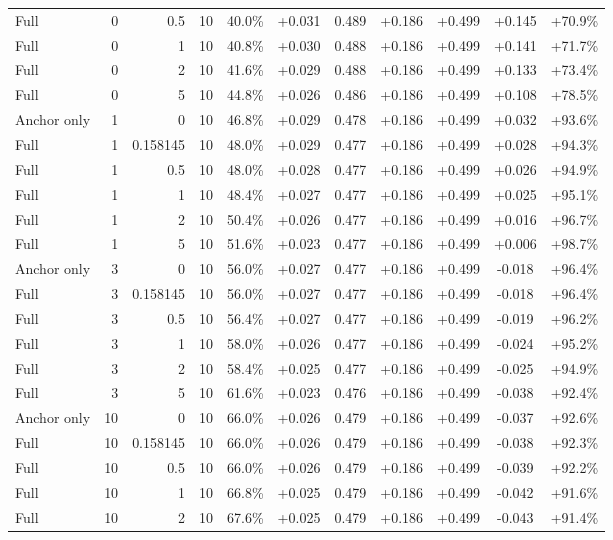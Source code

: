 \begin{table}[htbp]
\begin{tabular}{lrrrccccccc}
Full & 0 & 0.5 & 10 & 40.0\% & +0.031 & 0.489 & +0.186 & +0.499 & +0.145 & +70.9\% \\
Full & 0 & 1 & 10 & 40.8\% & +0.030 & 0.488 & +0.186 & +0.499 & +0.141 & +71.7\% \\
Full & 0 & 2 & 10 & 41.6\% & +0.029 & 0.488 & +0.186 & +0.499 & +0.133 & +73.4\% \\
Full & 0 & 5 & 10 & 44.8\% & +0.026 & 0.486 & +0.186 & +0.499 & +0.108 & +78.5\% \\
Anchor only & 1 & 0 & 10 & 46.8\% & +0.029 & 0.478 & +0.186 & +0.499 & +0.032 & +93.6\% \\
Full & 1 & 0.158145 & 10 & 48.0\% & +0.029 & 0.477 & +0.186 & +0.499 & +0.028 & +94.3\% \\
Full & 1 & 0.5 & 10 & 48.0\% & +0.028 & 0.477 & +0.186 & +0.499 & +0.026 & +94.9\% \\
Full & 1 & 1 & 10 & 48.4\% & +0.027 & 0.477 & +0.186 & +0.499 & +0.025 & +95.1\% \\
Full & 1 & 2 & 10 & 50.4\% & +0.026 & 0.477 & +0.186 & +0.499 & +0.016 & +96.7\% \\
Full & 1 & 5 & 10 & 51.6\% & +0.023 & 0.477 & +0.186 & +0.499 & +0.006 & +98.7\% \\
Anchor only & 3 & 0 & 10 & 56.0\% & +0.027 & 0.477 & +0.186 & +0.499 & -0.018 & +96.4\% \\
Full & 3 & 0.158145 & 10 & 56.0\% & +0.027 & 0.477 & +0.186 & +0.499 & -0.018 & +96.4\% \\
Full & 3 & 0.5 & 10 & 56.4\% & +0.027 & 0.477 & +0.186 & +0.499 & -0.019 & +96.2\% \\
Full & 3 & 1 & 10 & 58.0\% & +0.026 & 0.477 & +0.186 & +0.499 & -0.024 & +95.2\% \\
Full & 3 & 2 & 10 & 58.4\% & +0.025 & 0.477 & +0.186 & +0.499 & -0.025 & +94.9\% \\
Full & 3 & 5 & 10 & 61.6\% & +0.023 & 0.476 & +0.186 & +0.499 & -0.038 & +92.4\% \\
Anchor only & 10 & 0 & 10 & 66.0\% & +0.026 & 0.479 & +0.186 & +0.499 & -0.037 & +92.6\% \\
Full & 10 & 0.158145 & 10 & 66.0\% & +0.026 & 0.479 & +0.186 & +0.499 & -0.038 & +92.3\% \\
Full & 10 & 0.5 & 10 & 66.0\% & +0.026 & 0.479 & +0.186 & +0.499 & -0.039 & +92.2\% \\
Full & 10 & 1 & 10 & 66.8\% & +0.025 & 0.479 & +0.186 & +0.499 & -0.042 & +91.6\% \\
Full & 10 & 2 & 10 & 67.6\% & +0.025 & 0.479 & +0.186 & +0.499 & -0.043 & +91.4\% \\

\end{tabular}
\end{table}
